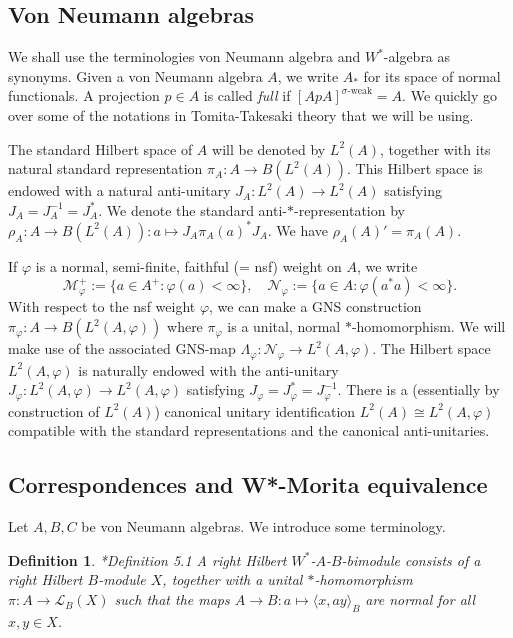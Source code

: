 \documentclass[reqno]{amsart}
\numberwithin{equation}{section}
\newtheorem{Def}[Theorem]{Definition}
\begin{document}
\subsection{Von Neumann algebras} We shall use the terminologies von Neumann algebra and $W^*$-algebra as synonyms. Given a von Neumann algebra $A$, we write $A_*$ for its space of normal functionals. A projection $p\in A$ is called \emph{full} if $[ApA]^{\sigma\text{-weak}}= A$. We quickly go over some of the notations in Tomita-Takesaki theory \cite{Tak03} that we will be using.

The standard Hilbert space of $A$ will be denoted by $L^2(A)$, together with its natural standard representation 
$\pi_A: A \to B(L^2(A)).$
This Hilbert space is endowed with a natural anti-unitary $J_A: L^2(A)\to L^2(A)$ satisfying $J_A= J_A^{-1}= J_A^*$. We denote the standard anti-$*$-representation by 
$\rho_A: A \to B(L^2(A)): a \mapsto J_A \pi_A(a)^* J_A.$
We have $\rho_A(A)' = \pi_A(A).$

If $\varphi$ is a normal, semi-finite, faithful (= nsf) weight on $A$, we write
$$\mathscr{M}_\varphi^+ :=\{a\in A^+: \varphi(a) <\infty\}, \quad \mathscr{N}_\varphi:= \{a\in A: \varphi(a^*a) < \infty\}.$$
With respect to the nsf weight $\varphi$, we can make a GNS construction $\pi_\varphi: A\to B(L^2(A, \varphi))$ where $\pi_\varphi$ is a unital, normal $*$-homomorphism. We will make use of the associated GNS-map $\Lambda_\varphi: \mathscr{N}_\varphi\to L^2(A, \varphi)$. The Hilbert space $L^2(A, \varphi)$ is naturally endowed with the anti-unitary
$J_\varphi: L^2(A, \varphi)\to L^2(A, \varphi)$ satisfying $J_\varphi= J_\varphi^* = J_\varphi^{-1}.$ 
There is a (essentially by construction of $L^2(A)$) canonical unitary identification $L^2(A)\cong L^2(A, \varphi)$ compatible with the standard representations and the canonical anti-unitaries. 

\subsection{Correspondences and W*-Morita equivalence} \label{corr}

Let $A,B,C$ be von Neumann algebras. We introduce some terminology. 

\begin{Def}\cite{Rie74}*{Definition 5.1}
    A right Hilbert $W^*$-$A$-$B$-bimodule consists of a right Hilbert $B$-module $X$, together with a unital $*$-homomorphism $\pi: A \to \mathscr{L}_B(X)$ such that the maps $A\to B: a \mapsto \langle x, ay\rangle_B$ are normal for all $x,y \in X$.
\end{Def}
\end{document}
